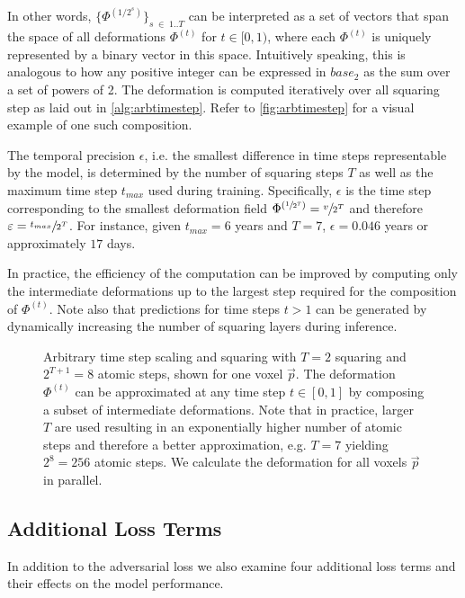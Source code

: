 In other words, $\{ \Phi^{(1 / 2^{s})} \}_{s \; \in \; 1 .. T}$ can be interpreted as a set of vectors that span the space of all deformations $\Phi^{(t)}$ for $t \in [0, 1)$, where each $\Phi^{(t)}$ is uniquely represented by a binary vector in this space. Intuitively speaking, this is analogous to how any positive integer can be expressed in $base_2$ as the sum over a set of powers of 2. The deformation is computed iteratively over all squaring step as laid out in \autoref{alg:arbtimestep}. Refer to \autoref{fig:arbtimestep} for a visual example of one such composition.

The temporal precision $\epsilon$, i.e. the smallest difference in time steps representable by the model, is determined by the number of squaring steps $T$ as well as the maximum time step $t_{max}$ used during training. Specifically, $\epsilon$ is the time step corresponding to the smallest deformation field $\Phi^{(\sfrac{1}{2^T})} = \sfrac{v}{2^T}$ and therefore $\varepsilon = \sfrac{t_{max}}{2^T}$. For instance, given $t_{max} = 6$ years and $T = 7$, $\epsilon = 0.046$ years or approximately $17$ days.

In practice, the efficiency of the computation can be improved by computing only the intermediate deformations up to the largest step required for the composition of $\Phi^{(t)}$. Note also that predictions for time steps $t > 1$ can be generated by dynamically increasing the number of squaring layers during inference.



\begin{figure}
	\centering
	
	\caption{Arbitrary time step scaling and squaring with $T = 2$ squaring and $ 2^{T+1} = 8 $ atomic steps, shown for one voxel $ \vec p $. The deformation $ \Phi^{(t)} $ can be approximated at any time step $ t \in [0, 1] $ by composing a subset of intermediate deformations. Note that in practice, larger $T$ are used resulting in an exponentially higher number of atomic steps and therefore a better approximation, e.g. $T = 7$ yielding $ 2^8 = 256 $ atomic steps. We calculate the deformation for all voxels $ \vec{p} $ in parallel.} \label{fig:arbtimestep}
\end{figure}

\subsection{Additional Loss Terms}
In addition to the adversarial loss we also examine four additional loss terms and their effects on the model performance.


